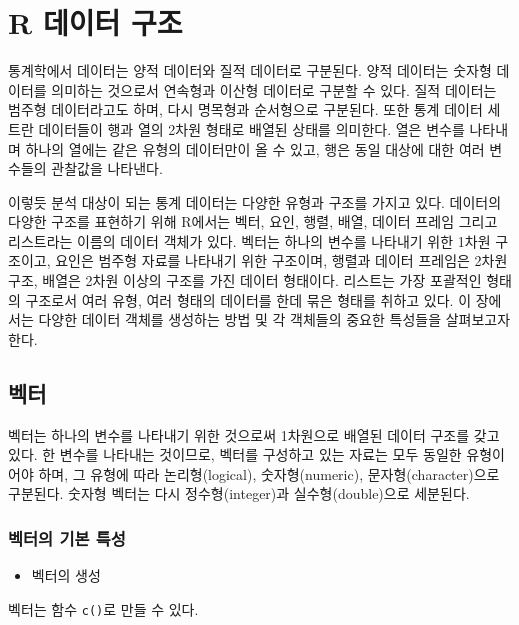 \documentclass[
]{book}
\providecommand{\tightlist}{%
  \setlength{\itemsep}{0pt}\setlength{\parskip}{0pt}}
\begin{document}
\hypertarget{data-structure}{%
\chapter{R 데이터 구조}\label{data-structure}}

통계학에서 데이터는 양적 데이터와 질적 데이터로 구분된다.
양적 데이터는 숫자형 데이터를 의미하는 것으로서 연속형과 이산형 데이터로 구분할 수 있다.
질적 데이터는 범주형 데이터라고도 하며, 다시 명목형과 순서형으로 구분된다.
또한 통계 데이터 세트란 데이터들이 행과 열의 2차원 형태로 배열된 상태를 의미한다.
열은 변수를 나타내며 하나의 열에는 같은 유형의 데이터만이 올 수 있고, 행은 동일 대상에 대한 여러 변수들의 관찰값을 나타낸다.

이렇듯 분석 대상이 되는 통계 데이터는 다양한 유형과 구조를 가지고 있다.
데이터의 다양한 구조를 표현하기 위해 R에서는 벡터, 요인, 행렬, 배열, 데이터 프레임 그리고 리스트라는 이름의 데이터 객체가 있다.
벡터는 하나의 변수를 나타내기 위한 1차원 구조이고, 요인은 범주형 자료를 나타내기 위한 구조이며, 행렬과 데이터 프레임은 2차원 구조, 배열은 2차원 이상의 구조를 가진 데이터 형태이다.
리스트는 가장 포괄적인 형태의 구조로서 여러 유형, 여러 형태의 데이터를 한데 묶은 형태를 취하고 있다.
이 장에서는 다양한 데이터 객체를 생성하는 방법 및 각 객체들의 중요한 특성들을 살펴보고자 한다.

\hypertarget{uxbca1uxd130}{%
\section{벡터}\label{uxbca1uxd130}}

벡터는 하나의 변수를 나타내기 위한 것으로써 1차원으로 배열된 데이터 구조를 갖고 있다.
한 변수를 나타내는 것이므로, 벡터를 구성하고 있는 자료는 모두 동일한 유형이어야 하며, 그 유형에 따라 논리형(logical), 숫자형(numeric), 문자형(character)으로 구분된다.
숫자형 벡터는 다시 정수형(integer)과 실수형(double)으로 세분된다.

\hypertarget{uxbca1uxd130uxc758-uxae30uxbcf8-uxd2b9uxc131}{%
\subsection{벡터의 기본 특성}\label{uxbca1uxd130uxc758-uxae30uxbcf8-uxd2b9uxc131}}

\begin{itemize}
\tightlist
\item
  벡터의 생성
\end{itemize}

벡터는 함수 \texttt{c()}로 만들 수 있다.
\end{document}
